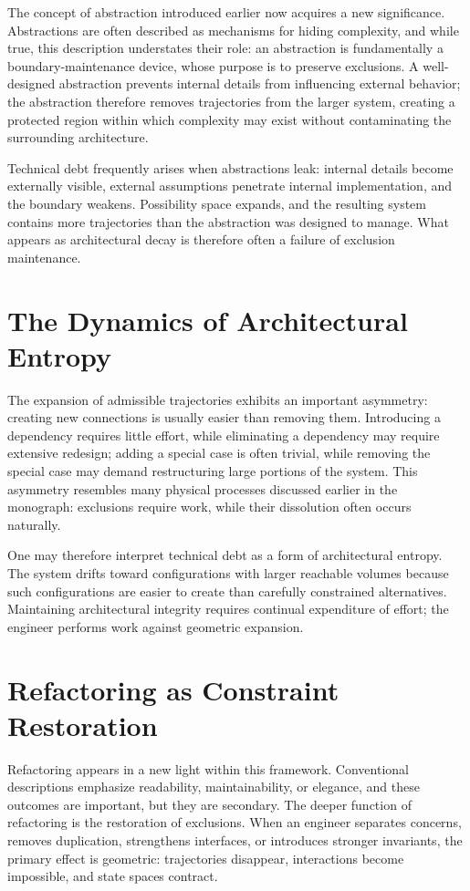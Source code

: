 \documentclass[11pt,oneside]{book}
\theoremstyle{plain}
\theoremstyle{definition}
\theoremstyle{remark}
\begin{document}
The concept of abstraction introduced earlier now acquires a new significance. Abstractions are often described as mechanisms for hiding complexity, and while true, this description understates their role: an abstraction is fundamentally a boundary-maintenance device, whose purpose is to preserve exclusions. A well-designed abstraction prevents internal details from influencing external behavior; the abstraction therefore removes trajectories from the larger system, creating a protected region within which complexity may exist without contaminating the surrounding architecture.

Technical debt frequently arises when abstractions leak: internal details become externally visible, external assumptions penetrate internal implementation, and the boundary weakens. Possibility space expands, and the resulting system contains more trajectories than the abstraction was designed to manage. What appears as architectural decay is therefore often a failure of exclusion maintenance.

\section{The Dynamics of Architectural Entropy}

The expansion of admissible trajectories exhibits an important asymmetry: creating new connections is usually easier than removing them. Introducing a dependency requires little effort, while eliminating a dependency may require extensive redesign; adding a special case is often trivial, while removing the special case may demand restructuring large portions of the system. This asymmetry resembles many physical processes discussed earlier in the monograph: exclusions require work, while their dissolution often occurs naturally.

One may therefore interpret technical debt as a form of architectural entropy. The system drifts toward configurations with larger reachable volumes because such configurations are easier to create than carefully constrained alternatives. Maintaining architectural integrity requires continual expenditure of effort; the engineer performs work against geometric expansion.

\section{Refactoring as Constraint Restoration}

Refactoring appears in a new light within this framework. Conventional descriptions emphasize readability, maintainability, or elegance, and these outcomes are important, but they are secondary. The deeper function of refactoring is the restoration of exclusions. When an engineer separates concerns, removes duplication, strengthens interfaces, or introduces stronger invariants, the primary effect is geometric: trajectories disappear, interactions become impossible, and state spaces contract.
\end{document}
